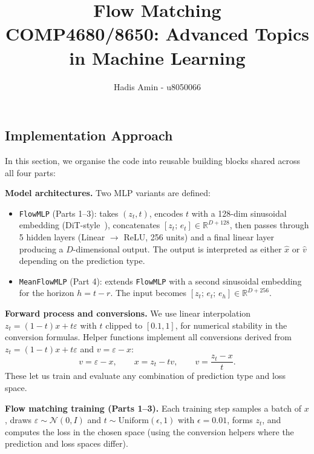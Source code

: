 \documentclass[11pt, a4paper]{article}
\title{
  \textbf{Flow Matching}\\[0.3em]
  \large COMP4680/8650: Advanced Topics in Machine Learning
}
\author{Hadis Amin - u8050066}
\date{}
\begin{document}
\maketitle


\subsection*{Implementation Approach}

In this section, we organise the code into reusable building blocks shared across all four parts:

\textbf{Model architectures.} Two MLP variants are defined:
\begin{itemize}[leftmargin=1.5em]
  \item \texttt{FlowMLP} (Parts 1--3): takes $(z_t, t)$, encodes $t$ with a
        128-dim sinusoidal embedding (DiT-style~\cite{peebles2023dit}), concatenates $[z_t;\, e_t] \in \mathbb{R}^{D+128}$,
        then passes through 5 hidden layers (Linear $\to$ ReLU, 256 units) and
        a final linear layer producing a $D$-dimensional output. The output is
        interpreted as either $\hat{x}$ or $\hat{v}$ depending on the
        prediction type.
  \item \texttt{MeanFlowMLP} (Part 4): extends \texttt{FlowMLP} with a second
        sinusoidal embedding for the horizon $h = t - r$. The input becomes
        $[z_t;\, e_t;\, e_h] \in \mathbb{R}^{D+256}$.
\end{itemize}

\textbf{Forward process and conversions.} We use linear interpolation
$z_t = (1-t)x + t\varepsilon$ with $t$ clipped to $[0.1, 1]$, for numerical 
stability in the conversion formulas. Helper functions implement all 
conversions derived from
$z_t = (1-t)x + t\varepsilon$ and $v = \varepsilon - x$:
\[
  v = \varepsilon - x, \qquad x = z_t - t v, \qquad v = \frac{z_t - x}{t}.
\]
These let us train and evaluate any combination of prediction type and loss
space.

\textbf{Flow matching training (Parts 1--3).} Each training step samples a
batch of $x$, draws $\varepsilon \sim \mathcal{N}(0, I)$ and
$t \sim \text{Uniform}(\epsilon, 1)$ with $\epsilon = 0.01$, forms $z_t$, and computes the
loss in the chosen space (using the conversion helpers where the prediction
and loss spaces differ).
\end{document}
